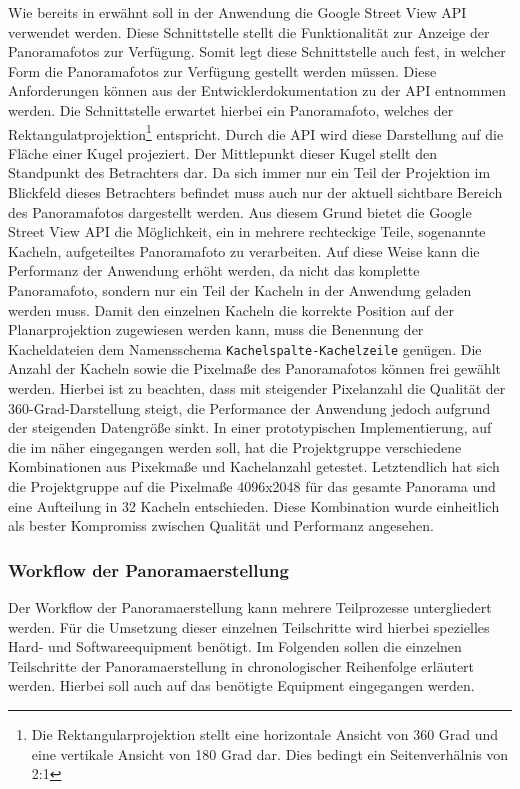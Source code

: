 Wie bereits in  erwähnt soll in der Anwendung die Google
Street View API verwendet werden. Diese Schnittstelle stellt die Funktionalität
zur Anzeige der Panoramafotos zur Verfügung. Somit legt diese Schnittstelle auch
fest, in welcher Form die Panoramafotos zur Verfügung gestellt werden müssen.
Diese Anforderungen können aus der Entwicklerdokumentation zu der API entnommen
werden. Die Schnittstelle erwartet hierbei ein Panoramafoto, welches der
Rektangulatprojektion\footnote{Die Rektangularprojektion stellt eine
horizontale Ansicht von 360 Grad und eine vertikale Ansicht von 180 Grad dar.
Dies bedingt ein Seitenverhälnis von 2:1} entspricht. Durch die API wird diese
Darstellung auf die Fläche einer Kugel projeziert. Der Mittlepunkt dieser Kugel
stellt den Standpunkt des Betrachters dar. Da sich immer nur ein Teil der
Projektion im Blickfeld dieses Betrachters befindet muss auch nur der aktuell
sichtbare Bereich des Panoramafotos dargestellt werden. Aus diesem Grund bietet
die Google Street View API die Möglichkeit, ein in mehrere rechteckige Teile,
sogenannte Kacheln, aufgeteiltes Panoramafoto zu verarbeiten. Auf diese Weise
kann die Performanz der Anwendung erhöht werden, da nicht das komplette
Panoramafoto, sondern nur ein Teil der Kacheln in der Anwendung geladen werden
muss. Damit den einzelnen Kacheln die korrekte Position auf der Planarprojektion
zugewiesen werden kann, muss die Benennung der Kacheldateien dem Namensschema
\texttt{Kachelspalte-Kachelzeile} genügen. Die Anzahl der Kacheln sowie die
Pixelmaße des Panoramafotos können frei gewählt werden. Hierbei ist zu beachten,
dass mit steigender Pixelanzahl die Qualität der 360-Grad-Darstellung steigt,
die Performance der Anwendung jedoch aufgrund der steigenden Datengröße sinkt.
In einer prototypischen Implementierung, auf die im 
näher eingegangen werden soll, hat die Projektgruppe verschiedene Kombinationen
aus Pixekmaße und Kachelanzahl getestet. Letztendlich hat sich die Projektgruppe
auf die Pixelmaße 4096x2048 für das gesamte Panorama und eine Aufteilung in 32
Kacheln entschieden. Diese Kombination wurde einheitlich als bester Kompromiss
zwischen Qualität und Performanz angesehen.

\subsubsection{Workflow der Panoramaerstellung}
\label{sec:Workflow}

Der Workflow der Panoramaerstellung kann mehrere Teilprozesse untergliedert
werden. Für die Umsetzung dieser einzelnen Teilschritte wird hierbei spezielles
Hard- und Softwareequipment benötigt. Im Folgenden sollen die einzelnen
Teilschritte der Panoramaerstellung in chronologischer Reihenfolge erläutert
werden. Hierbei soll auch auf das benötigte Equipment eingegangen werden.

